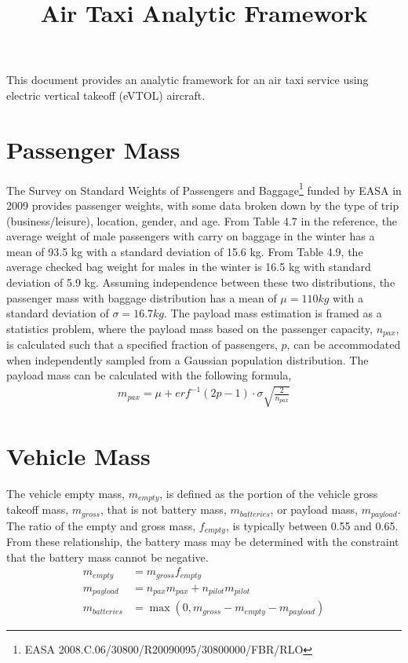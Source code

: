 \documentclass[12pt, letter]{article}
\begin{document}
\title{Air Taxi Analytic Framework}
This document provides an analytic framework for an air taxi service using electric vertical takeoff (eVTOL) aircraft. 
\section{Passenger Mass}
The Survey on Standard Weights of Passengers and Baggage\footnote{EASA 2008.C.06/30800/R20090095/30800000/FBR/RLO} funded by EASA in 2009 provides passenger weights, with some data broken down by the type of trip (business/leisure), location, gender, and age. From Table 4.7 in the reference, the average weight of male passengers with carry on baggage in the winter has a mean of 93.5 kg with a standard deviation of 15.6 kg. From Table 4.9, the average checked bag weight for males in the winter is 16.5 kg with standard deviation of 5.9 kg. Assuming independence between these two distributions, the passenger mass with baggage distribution has a mean of $\mu=110 kg$ with a standard deviation of $\sigma=16.7 kg$. The payload mass estimation is framed as a statistics problem, where the payload mass based on the passenger capacity, $n_{pax}$, is calculated such that a specified fraction of passengers, $p$, can be accommodated when independently sampled from a Gaussian population distribution. The payload mass can be calculated with the following formula,
\begin{align}
	m_{pax}=\mu+erf^{-1}\left(2p-1\right)\cdot\sigma\sqrt{\frac{2}{n_{pax}}}
\end{align}
\section{Vehicle Mass}
The vehicle empty mass, $m_{empty}$, is defined as the portion of the vehicle gross takeoff mass, $m_{gross}$, that is not battery mass, $m_{batteries}$, or payload mass, $m_{payload}$. The ratio of the empty and gross mass, $f_{empty}$, is typically between 0.55 and 0.65. From these relationship, the battery mass may be determined with the constraint that the battery mass cannot be negative.
\begin{align}
	m_{empty}&=m_{gross}f_{empty}\\
	m_{payload}&=n_{pax}m_{pax}+n_{pilot}m_{pilot}\\
	m_{batteries}&=\max\left(0,m_{gross}-m_{empty}-m_{payload}\right)
\end{align}
\end{document}
